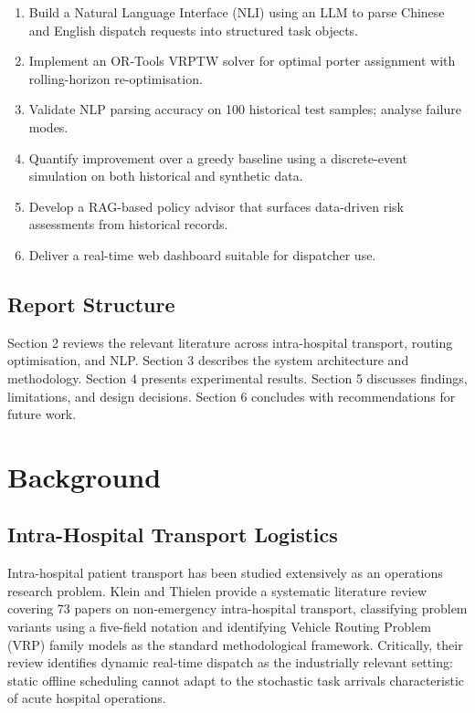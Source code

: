 \documentclass[12pt,a4paper]{article}
\begin{document}
\begin{enumerate}
  \item Build a Natural Language Interface (NLI) using an LLM to parse Chinese and English dispatch requests into structured task objects.
  \item Implement an OR-Tools VRPTW solver for optimal porter assignment with rolling-horizon re-optimisation.
  \item Validate NLP parsing accuracy on 100 historical test samples; analyse failure modes.
  \item Quantify improvement over a greedy baseline using a discrete-event simulation on both historical and synthetic data.
  \item Develop a RAG-based policy advisor that surfaces data-driven risk assessments from historical records.
  \item Deliver a real-time web dashboard suitable for dispatcher use.
\end{enumerate}

\subsection{Report Structure}

Section 2 reviews the relevant literature across intra-hospital transport, routing optimisation, and NLP. Section 3 describes the system architecture and methodology. Section 4 presents experimental results. Section 5 discusses findings, limitations, and design decisions. Section 6 concludes with recommendations for future work.

\section{Background}

\subsection{Intra-Hospital Transport Logistics}

Intra-hospital patient transport has been studied extensively as an operations research problem. Klein and Thielen \cite{klein2025} provide a systematic literature review covering 73 papers on non-emergency intra-hospital transport, classifying problem variants using a five-field notation and identifying Vehicle Routing Problem (VRP) family models as the standard methodological framework. Critically, their review identifies dynamic real-time dispatch as the industrially relevant setting: static offline scheduling cannot adapt to the stochastic task arrivals characteristic of acute hospital operations.
\end{document}
